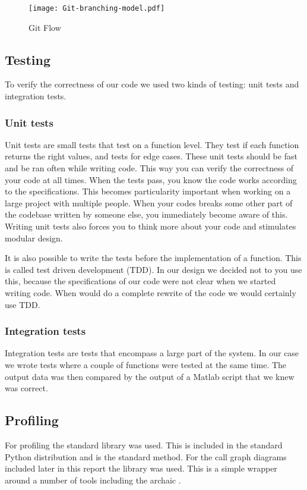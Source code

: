 \documentclass[a4paper, openany, oneside]{memoir}
\begin{document}
\begin{figure}[h]
    \centering
    \texttt{[image: Git-branching-model.pdf]}
    \caption{Git Flow}
    \label{fig:gitflow}
\end{figure}

\subsection{Testing}
\label{sec:testing}
To verify the correctness of our code we used two kinds of testing: unit tests and integration tests.

\subsubsection{Unit tests}
Unit tests are small tests that test on a function level. They test if each function returns the right values, and tests for edge cases. These unit tests should be fast and be ran often while writing code. This way you can verify the correctness of your code at all times. When the tests pass, you know the code works according to the specifications. This becomes particularity important when working on a large project with multiple people. When your codes breaks some other part of the codebase written by someone else, you immediately become aware of this. Writing unit tests also forces you to think more about your code and stimulates modular design.

It is also possible to write the tests before the implementation of a function. This is called test driven development (TDD). In our design we decided not to you use this, because the specifications of our code were not clear when we started writing code. When would do a complete rewrite of the code we would certainly use TDD.

\subsubsection{Integration tests}
Integration tests are tests that encompass a large part of the system. In our case we wrote tests where a couple of functions were tested at the same time. The output data was then compared by the output of a Matlab script that we knew was correct.


\subsection{Profiling}
\label{sec:profiling}
For profiling the standard  library was used. This is included in the standard Python distribution and is the standard method. For the call graph diagrams included later in this report the library  was used. This is a simple wrapper around a number of tools including the archaic .
\end{document}
